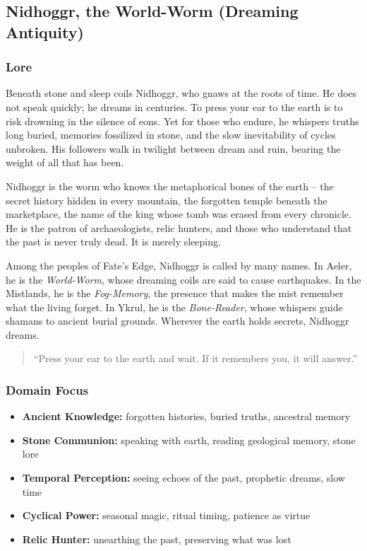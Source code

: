 
\subsection{Nidhoggr, the World-Worm (Dreaming Antiquity)}

\subsubsection*{Lore}
Beneath stone and sleep coils Nidhoggr, who gnaws at the roots of time. He does not speak quickly; he dreams in centuries. To press your ear to the earth is to risk drowning in the silence of eons. Yet for those who endure, he whispers truths long buried, memories fossilized in stone, and the slow inevitability of cycles unbroken. His followers walk in twilight between dream and ruin, bearing the weight of all that has been.

Nidhoggr is the worm who knows the metaphorical bones of the earth -- the secret history hidden in every mountain, the forgotten temple beneath the marketplace, the name of the king whose tomb was erased from every chronicle. He is the patron of archaeologists, relic hunters, and those who understand that the past is never truly dead. It is merely sleeping.

Among the peoples of Fate's Edge, Nidhoggr is called by many names. In Aeler, he is the \textit{World-Worm}, whose dreaming coils are said to cause earthquakes. In the Mistlands, he is the \textit{Fog-Memory}, the presence that makes the mist remember what the living forget. In Ykrul, he is the \textit{Bone-Reader}, whose whispers guide shamans to ancient burial grounds. Wherever the earth holds secrets, Nidhoggr dreams.

\begin{quote}
``Press your ear to the earth and wait. If it remembers you, it will answer.''
\end{quote}

\subsubsection*{Domain Focus}
\begin{itemize}
  \item \textbf{Ancient Knowledge:} forgotten histories, buried truths, ancestral memory
  \item \textbf{Stone Communion:} speaking with earth, reading geological memory, stone lore
  \item \textbf{Temporal Perception:} seeing echoes of the past, prophetic dreams, slow time
  \item \textbf{Cyclical Power:} seasonal magic, ritual timing, patience as virtue
  \item \textbf{Relic Hunter:} unearthing the past, preserving what was lost
\end{itemize}


